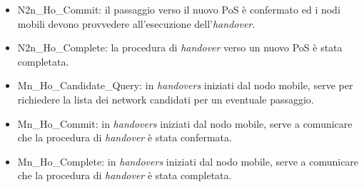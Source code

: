 \begin{itemize}
\item N2n\_Ho\_Commit: il passaggio verso il nuovo PoS è confermato ed i nodi mobili devono provvedere all'esecuzione dell'{\em handover}.
\item N2n\_Ho\_Complete: la procedura di {\em handover} verso un nuovo PoS è stata completata.
\item Mn\_Ho\_Candidate\_Query: in {\em handovers} iniziati dal nodo mobile, serve per richiedere la lista dei network candidati per un eventuale passaggio.
\item Mn\_Ho\_Commit: in {\em handovers} iniziati dal nodo mobile, serve a comunicare che la procedura di {\em handover} è stata confermata.
\item Mn\_Ho\_Complete: in {\em handovers} iniziati dal nodo mobile, serve a comunicare che la procedura di {\em handover} è stata completata.
\end{itemize}

